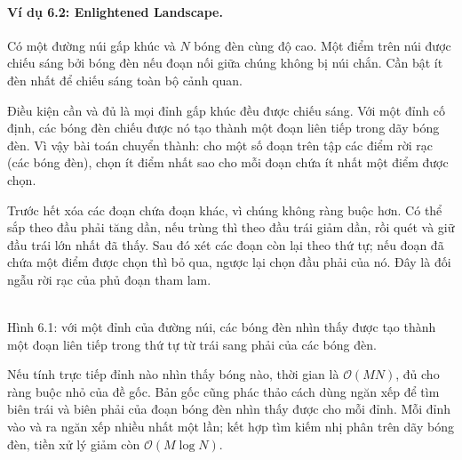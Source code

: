\documentclass[11pt]{article}
\newcommand{\Oh}{\mathcal{O}}
\begin{document}
\paragraph{Ví dụ 6.2: Enlightened Landscape.}
Có một đường núi gấp khúc và \(N\) bóng đèn cùng độ cao. Một điểm trên núi
được chiếu sáng bởi bóng đèn nếu đoạn nối giữa chúng không bị núi chắn. Cần
bật ít đèn nhất để chiếu sáng toàn bộ cảnh quan.

Điều kiện cần và đủ là mọi đỉnh gấp khúc đều được chiếu sáng. Với một đỉnh cố
định, các bóng đèn chiếu được nó tạo thành một đoạn liên tiếp trong dãy bóng
đèn. Vì vậy bài toán chuyển thành: cho một số đoạn trên tập các điểm rời rạc
(các bóng đèn), chọn ít điểm nhất sao cho mỗi đoạn chứa ít nhất một điểm được
chọn.

Trước hết xóa các đoạn chứa đoạn khác, vì chúng không ràng buộc hơn. Có thể
sắp theo đầu phải tăng dần, nếu trùng thì theo đầu trái giảm dần, rồi quét và
giữ đầu trái lớn nhất đã thấy. Sau đó xét các đoạn còn lại theo thứ tự; nếu
đoạn đã chứa một điểm được chọn thì bỏ qua, ngược lại chọn đầu phải của nó.
Đây là đối ngẫu rời rạc của phủ đoạn tham lam.

\begin{center}
\\[-0.1em]
{\small Hình 6.1: với một đỉnh của đường núi, các bóng đèn nhìn thấy được tạo
thành một đoạn liên tiếp trong thứ tự từ trái sang phải của các bóng đèn.}
\end{center}

Nếu tính trực tiếp đỉnh nào nhìn thấy bóng nào, thời gian là \(\Oh(MN)\), đủ
cho ràng buộc nhỏ của đề gốc. Bản gốc cũng phác thảo cách dùng ngăn xếp để tìm
biên trái và biên phải của đoạn bóng đèn nhìn thấy được cho mỗi đỉnh. Mỗi đỉnh
vào và ra ngăn xếp nhiều nhất một lần; kết hợp tìm kiếm nhị phân trên dãy bóng
đèn, tiền xử lý giảm còn \(\Oh(M\log N)\).
\end{document}
